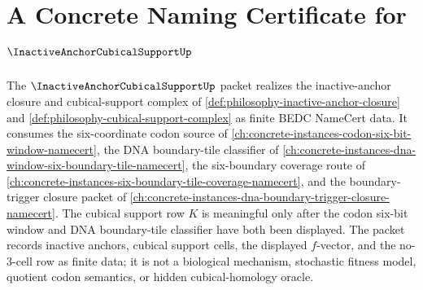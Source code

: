 \chapter{A Concrete Naming Certificate for $\InactiveAnchorCubicalSupportUp$}
\label{ch:concrete-instances-inactive-anchor-cubical-support-namecert}

The $\InactiveAnchorCubicalSupportUp$ packet realizes the inactive-anchor closure and cubical-support complex of \autoref{def:philosophy-inactive-anchor-closure} and \autoref{def:philosophy-cubical-support-complex} as finite BEDC NameCert data. It consumes the six-coordinate codon source of \autoref{ch:concrete-instances-codon-six-bit-window-namecert}, the DNA boundary-tile classifier of \autoref{ch:concrete-instances-dna-window-six-boundary-tile-namecert}, the six-boundary coverage route of \autoref{ch:concrete-instances-six-boundary-tile-coverage-namecert}, and the boundary-trigger closure packet of \autoref{ch:concrete-instances-dna-boundary-trigger-closure-namecert}. The cubical support row $K$ is meaningful only after the codon six-bit window and DNA boundary-tile classifier have both been displayed. The packet records inactive anchors, cubical support cells, the displayed $f$-vector, and the no-$3$-cell row as finite data; it is not a biological mechanism, stochastic fitness model, quotient codon semantics, or hidden cubical-homology oracle.

